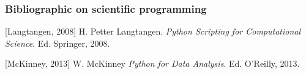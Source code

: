 \documentclass[10pt,compress]{beamer} %
\begin{document}
\begin{frame}
  \frametitle<presentation>{Bibliographic on scientific programming}

  \begin{thebibliography}{2}

  \beamertemplatebookbibitems
        
     [Langtangen, 2008]
     H. Petter Langtangen.
    \newblock \emph{Python Scripting for Computational Science}.
    \newblock Ed. Springer, 2008.
    
    [McKinney, 2013]
     W. McKinney
    \newblock \emph{Python for Data Analysis}.
    \newblock Ed. O'Reilly, 2013.
  
  \end{thebibliography}
\end{frame}
\end{document}
